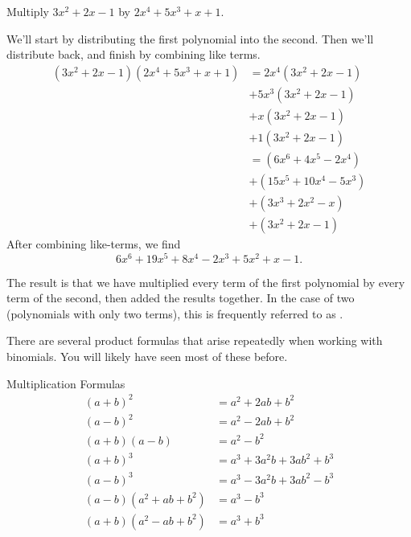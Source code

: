 \documentclass{ximera}
\begin{document}
\begin{example}
	Multiply $3x^2 + 2x - 1$ by $2x^4 + 5x^3+ x + 1$.
	\begin{explanation}
		We'll start by distributing the first polynomial into the second.  Then we'll distribute back, and finish by combining like terms.
		\begin{align*}
			(3x^2+ 2x-1)(2x^4 + 5x^3 + x +1) &= 2x^4(3x^2+ 2x-1) \\
			 &+ 5x^3 (3x^2+ 2x-1) \\
			 &+ x (3x^2+ 2x-1) \\
			 &+ 1(3x^2+ 2x-1)\\
				&= (6x^6 + 4x^5 - 2x^4) \\
				&+ (15x^5 + 10x^4 - 5x^3) \\
				&+ (3x^3+2x^2-x) \\
				&+(3x^2+2x-1)
		\end{align*}
		After combining like-terms, we find \[6x^6 + 19x^5 +8x^4 - 2x^3 + 5x^2+ x - 1.\]
	\end{explanation}
\end{example}
The result is that we have multiplied every term of the first polynomial by every term of the second, then added the results together.  In the case of two
 (polynomials with only two terms), this is frequently referred to as .

There are several product formulas that arise repeatedly when working with binomials.  You will likely have seen most of these before.
\begin{xbox}{Multiplication Formulas}
		\begin{align*}
			(a + b)^2 &= a^2 + 2ab + b^2\\
			(a-b)^2 &= a^2 - 2ab + b^2\\
			(a+b)(a-b) &= a^2 - b^2\\
			(a+b)^3 &= a^3 + 3 a^2 b + 3 ab^2 + b^3\\
			(a-b)^3 &= a^3 - 3 a^2 b + 3 ab^2 - b^3\\
			(a-b)(a^2 + ab + b^2) &= a^3 - b^3\\
			(a+b)(a^2-ab+b^2) &= a^3 + b^3
		\end{align*}
\end{xbox}
\end{document}
